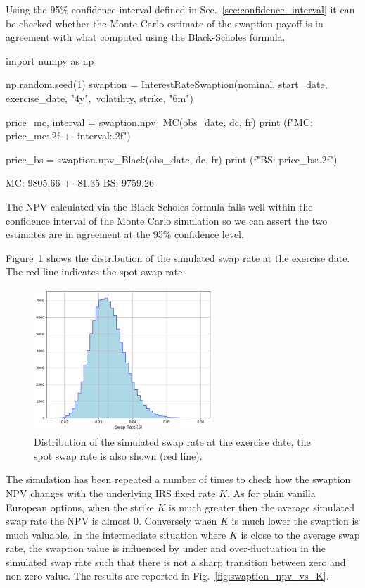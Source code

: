 Using the 95\% confidence interval defined in Sec.~\ref{sec:confidence_interval} it can be checked whether the Monte Carlo estimate of the swaption payoff is in agreement with what computed using the Black-Scholes formula.

\begin{ipython}
import numpy as np

np.random.seed(1)
swaption = InterestRateSwaption(nominal, start_date, exercise_date, "4y",\
                                volatility, strike, "6m")

price_mc, interval = swaption.npv_MC(obs_date, dc, fr)
print (f"MC: {price_mc:.2f} +- {interval:.2f}")

price_bs = swaption.npv_Black(obs_date, dc, fr)
print (f"BS: {price_bs:.2f}")
\end{ipython}
\begin{ioutput}
MC: 9805.66 +- 81.35
BS: 9759.26
\end{ioutput}

The NPV calculated via the Black-Scholes formula falls well within the confidence interval of the Monte Carlo simulation so we can assert the two estimates are in agreement at the 95\% confidence level.

Figure~\ref{fig:swap_rate} shows the distribution of the simulated swap rate at the exercise date. The red line indicates the spot swap rate.

\begin{figure}[htb]
	\centering
	\includegraphics[width=0.6\textwidth]{figures/simulated_swap_rate}
	\caption{Distribution of the simulated swap rate at the exercise date, the spot swap rate is also shown (red line).}
	\label{fig:swap_rate}
\end{figure}

The simulation has been repeated a number of times to check how the swaption NPV changes with the underlying IRS fixed rate $K$. As for plain vanilla European options, when the strike $K$ is much greater then the average simulated swap rate the NPV is almost 0. Conversely when $K$ is much lower the swaption is much valuable. In the intermediate situation where $K$ is close to the average swap rate, the swaption value is influenced by under and over-fluctuation in the simulated swap rate such that there is not a sharp transition between zero and non-zero value.
The results are reported in Fig.~\ref{fig:swaption_npv_vs_K}.

